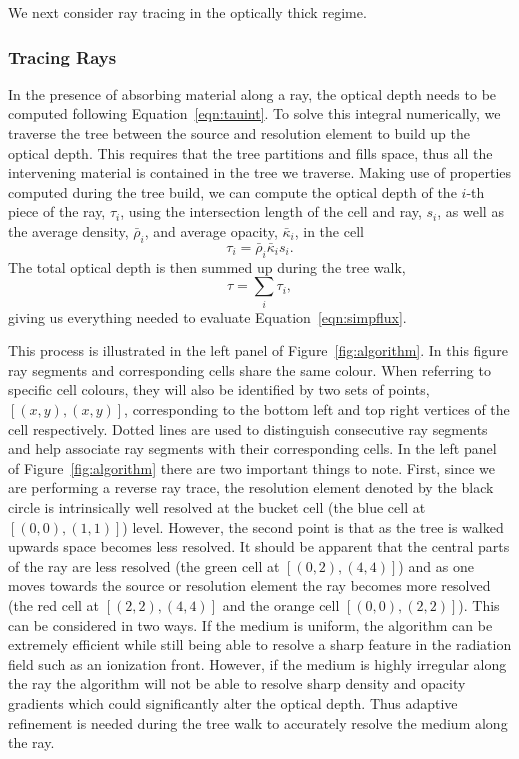 \documentclass[fleq,usenatbib]{mnras}
\begin{document}
{We next consider ray tracing in the optically thick regime.

\subsubsection{Tracing Rays}
In the presence of absorbing material along a ray, the optical depth needs to 
be computed following
Equation~\ref{eqn:tauint}. To solve this integral numerically, we traverse 
the tree between the source and resolution element to build up the optical 
depth. This requires that the tree partitions and fills space, thus all 
the intervening material is contained in the tree we traverse. Making 
use of properties computed during the tree build, we can compute the optical 
depth of the $i$-th piece of the ray, $\tau_i$, using the intersection length 
of the cell and ray, $s_i$, as well as the average density, $\bar{\rho}_i$, 
and average opacity, $\bar{\kappa}_i$, in the cell
\begin{equation}
\label{eqn:taui}
\tau_i = \bar{\rho}_i \bar{\kappa}_i s_i.
\end{equation}
The total optical depth is then summed up during the tree walk,
\begin{equation}
\label{eqn:tausum}
\tau = \sum_i \tau_i,
\end{equation}
giving us everything needed to evaluate Equation~\ref{eqn:simpflux}. 

This process is illustrated in the left panel of Figure~\ref{fig:algorithm}. 
In this figure ray segments and corresponding cells share 
the same colour. When referring to specific cell colours, they will also be 
identified by two sets of points, $[(x,y),(x,y)]$, corresponding to the bottom 
left and top right vertices of the cell respectively. Dotted lines are used to 
distinguish consecutive ray segments and help associate ray segments with 
their corresponding cells. In the left panel of Figure~\ref{fig:algorithm} 
there are two important things to note. First, since we are performing a 
reverse ray trace, the resolution element denoted by the black circle is 
intrinsically well resolved at the bucket cell (the blue cell at 
$[(0,0),(1,1)]$) level. However, the second point is that as the tree is 
walked upwards space becomes less resolved. It should be apparent that the 
central parts of the ray are less resolved (the green cell at $[(0,2),(4,4)]$) 
and as one moves towards the source or resolution element the ray becomes more 
resolved (the red cell at $[(2,2),(4,4)]$ and the orange cell 
$[(0,0),(2,2)]$). This can be considered in two ways. If the medium is 
uniform, the algorithm can be extremely efficient while still being able to 
resolve a sharp feature in the radiation field such as an ionization front. 
However, if the medium is highly irregular along the ray the algorithm will 
not be able to resolve sharp density and opacity gradients which could 
significantly alter the optical depth. Thus adaptive refinement is needed 
during the tree walk to accurately resolve the medium along the ray.

}
\end{document}

